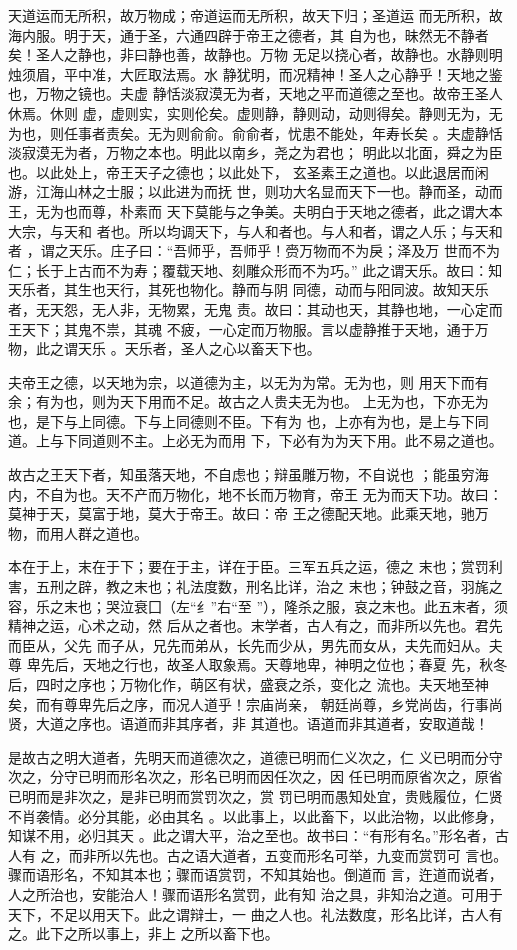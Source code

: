 \documentclass[]{article}
\begin{document}
天道运而无所积，故万物成；帝道运而无所积，故天下归；圣道运
而无所积，故海内服。明于天，通于圣，六通四辟于帝王之德者，其
自为也，昧然无不静者矣！圣人之静也，非曰静也善，故静也。万物
无足以挠心者，故静也。水静则明烛须眉，平中准，大匠取法焉。水
静犹明，而况精神！圣人之心静乎！天地之鉴也，万物之镜也。夫虚
静恬淡寂漠无为者，天地之平而道德之至也。故帝王圣人休焉。休则
虚，虚则实，实则伦矣。虚则静，静则动，动则得矣。静则无为，无
为也，则任事者责矣。无为则俞俞。俞俞者，忧患不能处，年寿长矣
。夫虚静恬淡寂漠无为者，万物之本也。明此以南乡，尧之为君也；
明此以北面，舜之为臣也。以此处上，帝王天子之德也；以此处下，
玄圣素王之道也。以此退居而闲游，江海山林之士服；以此进为而抚
世，则功大名显而天下一也。静而圣，动而王，无为也而尊，朴素而
天下莫能与之争美。夫明白于天地之德者，此之谓大本大宗，与天和
者也。所以均调天下，与人和者也。与人和者，谓之人乐；与天和者
，谓之天乐。庄子曰：``吾师乎，吾师乎！赍万物而不为戾；泽及万
世而不为仁；长于上古而不为寿；覆载天地、刻雕众形而不为巧。''
此之谓天乐。故曰：知天乐者，其生也天行，其死也物化。静而与阴
同德，动而与阳同波。故知天乐者，无天怨，无人非，无物累，无鬼
责。故曰：其动也天，其静也地，一心定而王天下；其鬼不祟，其魂
不疲，一心定而万物服。言以虚静推于天地，通于万物，此之谓天乐
。天乐者，圣人之心以畜天下也。

夫帝王之德，以天地为宗，以道德为主，以无为为常。无为也，则
用天下而有余；有为也，则为天下用而不足。故古之人贵夫无为也。
上无为也，下亦无为也，是下与上同德。下与上同德则不臣。下有为
也，上亦有为也，是上与下同道。上与下同道则不主。上必无为而用
下，下必有为为天下用。此不易之道也。

故古之王天下者，知虽落天地，不自虑也；辩虽雕万物，不自说也
；能虽穷海内，不自为也。天不产而万物化，地不长而万物育，帝王
无为而天下功。故曰：莫神于天，莫富于地，莫大于帝王。故曰：帝
王之德配天地。此乘天地，驰万物，而用人群之道也。

本在于上，末在于下；要在于主，详在于臣。三军五兵之运，德之
末也；赏罚利害，五刑之辟，教之末也；礼法度数，刑名比详，治之
末也；钟鼓之音，羽旄之容，乐之末也；哭泣衰囗（左``纟''右``至
''），隆杀之服，哀之末也。此五末者，须精神之运，心术之动，然
后从之者也。末学者，古人有之，而非所以先也。君先而臣从，父先
而子从，兄先而弟从，长先而少从，男先而女从，夫先而妇从。夫尊
卑先后，天地之行也，故圣人取象焉。天尊地卑，神明之位也；春夏
先，秋冬后，四时之序也；万物化作，萌区有状，盛衰之杀，变化之
流也。夫天地至神矣，而有尊卑先后之序，而况人道乎！宗庙尚亲，
朝廷尚尊，乡党尚齿，行事尚贤，大道之序也。语道而非其序者，非
其道也。语道而非其道者，安取道哉！

是故古之明大道者，先明天而道德次之，道德已明而仁义次之，仁
义已明而分守次之，分守已明而形名次之，形名已明而因任次之，因
任已明而原省次之，原省已明而是非次之，是非已明而赏罚次之，赏
罚已明而愚知处宜，贵贱履位，仁贤不肖袭情。必分其能，必由其名
。以此事上，以此畜下，以此治物，以此修身，知谋不用，必归其天
。此之谓大平，治之至也。故书曰：``有形有名。''形名者，古人有
之，而非所以先也。古之语大道者，五变而形名可举，九变而赏罚可
言也。骤而语形名，不知其本也；骤而语赏罚，不知其始也。倒道而
言，迕道而说者，人之所治也，安能治人！骤而语形名赏罚，此有知
治之具，非知治之道。可用于天下，不足以用天下。此之谓辩士，一
曲之人也。礼法数度，形名比详，古人有之。此下之所以事上，非上
之所以畜下也。
\end{document}
